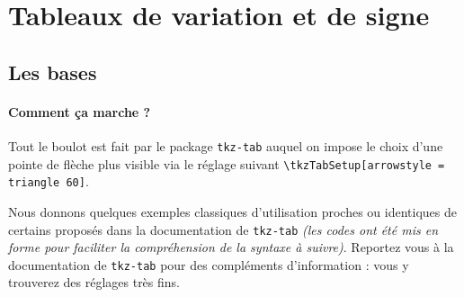 \documentclass[12pt,a4paper]{article}
\begin{document}

\section{Tableaux de variation et de signe}

\subsection{Les bases}

\paragraph{Comment ça marche ?}

Tout le boulot est fait par le package \verb+tkz-tab+ auquel on impose le choix d'une pointe de flèche plus visible via le réglage suivant \verb+\tkzTabSetup[arrowstyle = triangle 60]+.

\medskip

Nous donnons quelques exemples classiques d'utilisation proches ou identiques de certains proposés dans la documentation de \verb+tkz-tab+ \emph{(les codes ont été mis en forme pour faciliter la compréhension de la syntaxe à suivre)}.
Reportez vous à la documentation de \verb+tkz-tab+ pour des compléments d'information : vous y trouverez des réglages très fins.





\begin{latexex-flat}
\end{latexex-flat}





\begin{latexex-flat}
\end{latexex-flat}
\end{document}
